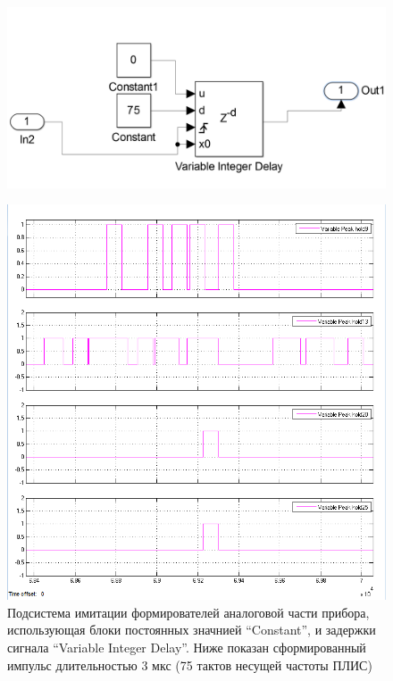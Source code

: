 \begin{figure}
	\centering
	\includegraphics[width=0.7\linewidth]{images/sim_form1}
	\caption{}
	\label{fig:sim_form1}
\end{figure}
\begin{figure}
	\centering
	\includegraphics[width=0.7\linewidth]{images/sim_form2}
	\caption{Подсистема имитации формирователей аналоговой части прибора, использующая блоки постоянных значнией “Constant”, и задержки сигнала “Variable Integer Delay”. Ниже показан сформированный импульс длительностью 3 мкс (75 тактов несущей частоты ПЛИС)}
	\label{fig:sim_form2}
\end{figure}

